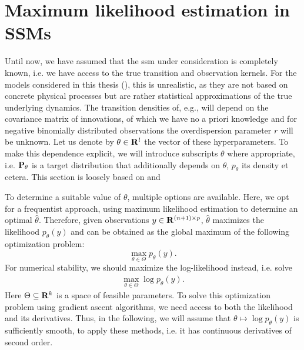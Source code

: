 \section{Maximum likelihood estimation in SSMs}
\label{sec:maximum_likelihood_estimation}

Until now, we have assumed that the \acrshort{ssm} under consideration is completely known, i.e. we have access to the true transition and observation kernels. For the models considered in this thesis (), this is unrealistic, as they are not based on concrete physical processes but are rather statistical approximations of the true underlying dynamics. The transition densities of, e.g.,  will depend on the covariance matrix of innovations, of which we have no a priori knowledge and for negative binomially distributed observations the overdispersion parameter $r$ will be unknown. Let us denote by $\theta\in\R^{l}$ the vector of these hyperparameters. 
To make this dependence explicit, we will introduce subscripts $\theta$ where appropriate, i.e. $\P_{\theta}$ is a target distribution that additionally depends on $\theta$, $p_{\theta}$ its density et cetera. This section is loosely based on \citep[Chapter 7 \& 11]{Durbin2012Time} and \citep[Chapter 14]{Chopin2020Introduction}

To determine a suitable value of $\theta$, multiple options are available. Here, we opt for a frequentist approach, using maximum likelihood estimation to determine an optimal $\hat \theta$. Therefore, given observations $y\in\R^{(n+1)\times p}$, $\hat\theta$ maximizes the likelihood $p_{\theta}(y)$ and can be obtained as the global maximum of the following optimization problem: 
$$
    \max_{\theta \in \Theta} p_{\theta}(y).
$$
For numerical stability, we should maximize the log-likelihood instead, i.e. solve 
\begin{align}
    \label{eq:max-log-p}
    \max_{\theta \in \Theta} \log p_{\theta}(y).
\end{align}
Here $\Theta \subseteq \R^{k}$  is a space of feasible parameters. To solve this optimization problem using gradient ascent algorithms, we need access to both the likelihood and its derivatives. Thus, in the following, we will assume that $\theta \mapsto \log p_{\theta}(y)$ is sufficiently smooth, to apply these methods, i.e. it has continuous derivatives of second order. 

